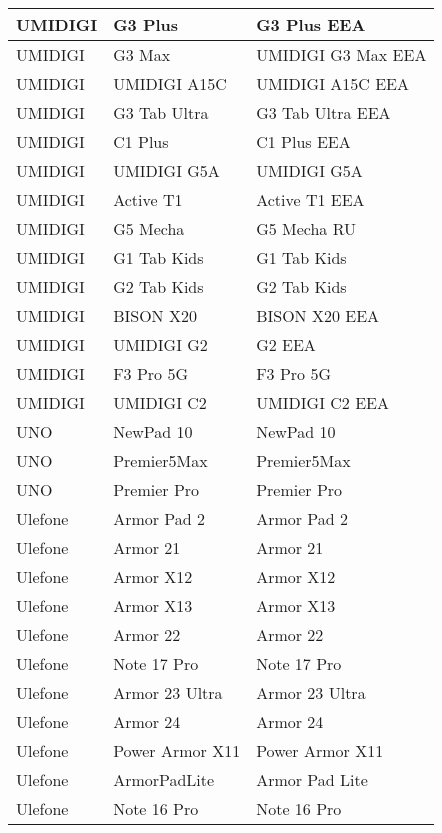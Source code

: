 \begin{tabularx}{\linewidth}{|l|X|X|}
        UMIDIGI & G3 Plus & G3 Plus EEA \\ \hline
        UMIDIGI & G3 Max & UMIDIGI G3 Max EEA \\ \hline
        UMIDIGI & UMIDIGI A15C & UMIDIGI A15C EEA \\ \hline
        UMIDIGI & G3 Tab Ultra & G3 Tab Ultra EEA \\ \hline
        UMIDIGI & C1 Plus & C1 Plus EEA \\ \hline
        UMIDIGI & UMIDIGI G5A & UMIDIGI G5A \\ \hline
        UMIDIGI & Active T1 & Active T1 EEA \\ \hline
        UMIDIGI & G5 Mecha & G5 Mecha RU \\ \hline
        UMIDIGI & G1 Tab Kids & G1 Tab Kids \\ \hline
        UMIDIGI & G2 Tab Kids & G2 Tab Kids \\ \hline
        UMIDIGI & BISON X20 & BISON X20 EEA \\ \hline
        UMIDIGI & UMIDIGI G2 & G2 EEA \\ \hline
        UMIDIGI & F3 Pro 5G & F3 Pro 5G \\ \hline
        UMIDIGI & UMIDIGI C2 & UMIDIGI C2 EEA \\ \hline
        UNO & NewPad 10 & NewPad 10 \\ \hline
        UNO & Premier5Max & Premier5Max \\ \hline
        UNO & Premier Pro & Premier Pro \\ \hline
        Ulefone & Armor Pad 2 & Armor Pad 2 \\ \hline
        Ulefone & Armor 21 & Armor 21 \\ \hline
        Ulefone & Armor X12 & Armor X12 \\ \hline
        Ulefone & Armor X13 & Armor X13 \\ \hline
        Ulefone & Armor 22 & Armor 22 \\ \hline
        Ulefone & Note 17 Pro & Note 17 Pro \\ \hline
        Ulefone & Armor 23 Ultra & Armor 23 Ultra \\ \hline
        Ulefone & Armor 24 & Armor 24 \\ \hline
        Ulefone & Power Armor X11 & Power Armor X11 \\ \hline
        Ulefone & ArmorPadLite & Armor Pad Lite \\ \hline
        Ulefone & Note 16 Pro & Note 16 Pro \\ \hline

\end{tabularx}

